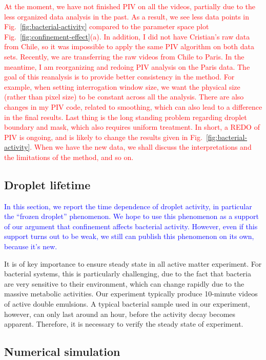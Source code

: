 \documentclass[%
10pt,
superscriptaddress,
twocolumn,
 amsmath,amssymb,
 aps,prx,
]{revtex4-2}
\begin{document}
\textcolor{red}{
At the moment, we have not finished PIV on all the videos, partially due to the less organized data analysis in the past.
As a result, we see less data points in Fig.~\ref{fig:bacterial-activity} compared to the parameter space plot Fig.~\ref{fig:confinement-effect}(a).
In addition, I did not have Cristian's raw data from Chile, so it was impossible to apply the same PIV algorithm on both data sets.
Recently, we are transferring the raw videos from Chile to Paris.
In the meantime, I am reorganizing and redoing PIV analysis on the Paris data.
The goal of this reanalysis is to provide better consistency in the method.
For example, when setting interrogation window size, we want the physical size (rather than pixel size) to be constant across all the analysis.
There are also changes in my PIV code, related to smoothing, which can also lead to a difference in the final results.
Last thing is the long standing problem regarding droplet boundary and mask, which also requires uniform treatment.
In short, a REDO of PIV is ongoing, and is likely to change the results given in Fig.~\ref{fig:bacterial-activity}.
When we have the new data, we shall discuss the interpretations and the limitations of the method, and so on.
}
\subsection{Droplet lifetime}
\textcolor{blue}{
In this section, we report the time dependence of droplet activity, in particular the ``frozen droplet'' phenomenon.
We hope to use this phenomenon as a support of our argument that confinement affects bacterial activity.
However, even if this support turns out to be weak, we still can publish this phenomenon on its own, because it's new.
}

It is of key importance to ensure steady state in all active matter experiment.
For bacterial systems, this is particularly challenging, due to the fact that bacteria are very sensitive to their environment, which can change rapidly due to the massive metabolic activities. 
Our experiment typically produce 10-minute videos of active double emulsions. 
A typical bacterial sample used in our experiment, however, can only last around an hour, before the activity decay becomes apparent. 
Therefore, it is necessary to verify the steady state of experiment. 

\subsection{Numerical simulation}
\end{document}
